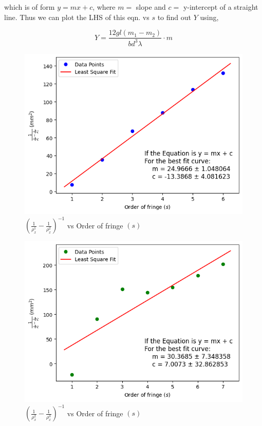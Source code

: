     which is of form $y=mx+c$, where $m=$ slope and $c=$ y-intercept of a straight line. Thus we can plot the LHS of this eqn. vs $s$ to find out $Y$ using,

    \begin{equation}
        Y = \frac{12gl(m_1-m_2)}{bd^3\lambda}\cdot m
    \end{equation}
    
    \begin{figure}[H]
        \centering
        \label{graph:1}
        \includegraphics[width=0.8\columnwidth]{images/1.png}
        \caption{$(\frac{1}{\rho_{x}^1}-\frac{1}{\rho_{x}^2})^{-1}$ vs Order of fringe $(s)$}
    \end{figure}

    \begin{figure}[H]
        \centering
        \label{graph:2}
        \includegraphics[width=0.8\columnwidth]{images/2.png}
        \caption{$(\frac{1}{\rho_{x}^2}-\frac{1}{\rho_{x}^3})^{-1}$ vs Order of fringe $(s)$}
    \end{figure}

